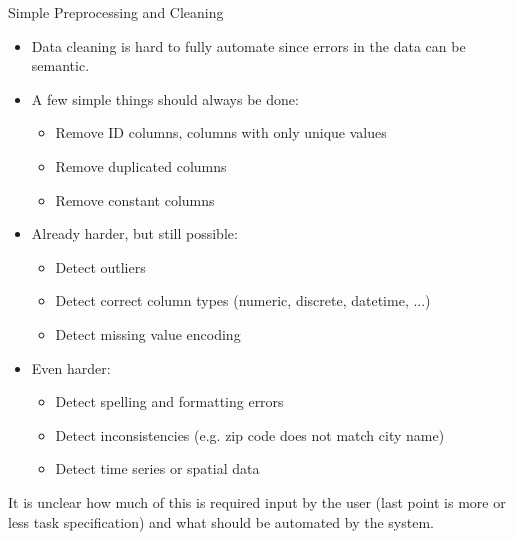 	\begin{frame}{Simple Preprocessing and Cleaning}
		\begin{itemize}
			\item Data cleaning is hard to fully automate since errors in the data can be semantic.
			\item A few simple things should always be done:
			\pause
			\begin{itemize}
				\item Remove ID columns, columns with only unique values
				\item Remove duplicated columns
				\item Remove constant columns
			\end{itemize}
			\pause
			\item Already harder, but still possible:
			\begin{itemize}
				\item Detect outliers
				\item Detect correct column types (numeric, discrete, datetime, ...)
				\item Detect missing value encoding
			\end{itemize}
			\pause
			\item Even harder:
			\begin{itemize}
				\item Detect spelling and formatting errors
				\item Detect inconsistencies (e.g. zip code does not match city name)
				\item Detect time series or spatial data 
			\end{itemize}  
		\end{itemize}

		
		It is unclear how much of this is required input by the user (last point is more or less task specification) and what should be automated by the system. 
		
	\end{frame}

